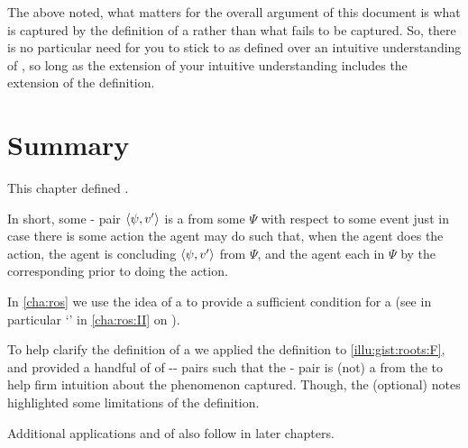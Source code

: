 \begin{note}
  The above noted, what matters for the overall argument of this document is what is captured by the definition of a \fc{} rather than what fails to be captured.
  So, there is no particular need for you to stick to  as defined over an intuitive understanding of , so long as the extension of your intuitive understanding includes the extension of the definition.
\end{note}



\section*{Summary}


\begin{note}
  This chapter defined .

  In short, some - pair \(\langle\psi, v'\rangle\) is a \fc{} from some \pool{} \(\Psi\) with respect to some event just in case there is some action the agent may do such that, when the agent does the action, the agent is concluding \(\langle\psi, v'\rangle\) from \(\Psi\), and the agent \evals{} each \prop{} in \(\Psi\) by the corresponding \val{} prior to doing the action.

  In \autoref{cha:ros} we use the idea of a \fc{} to provide a sufficient condition for a \fofr{} (see in particular `\supportII{}' in \autoref{cha:ros:II} on ).

  To help clarify the definition of a \fc{} we applied the definition to \autoref{illu:gist:roots:F}, and provided a handful of  of -- pairs such that the - pair is (not) a \fc{} from the \pool{} to help firm intuition about the phenomenon captured.
  Though, the (optional) notes highlighted some limitations of the definition.

  Additional applications and  of  also follow in later chapters.
\end{note}


